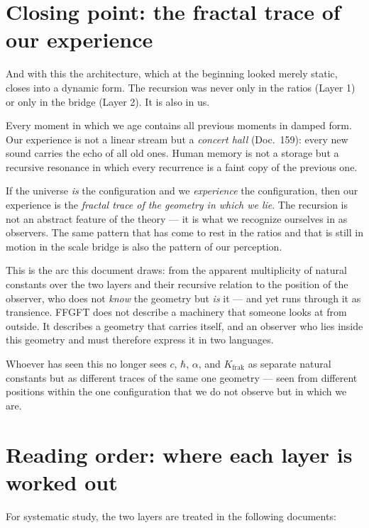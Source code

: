 \section{Closing point: the fractal trace of our experience}

And with this the architecture, which at the beginning looked merely
static, closes into a dynamic form. The recursion was never only in
the ratios (Layer 1) or only in the bridge (Layer 2). It is also in us.

Every moment in which we age contains all previous moments in damped
form. Our experience is not a linear stream but a \emph{concert hall}
(Doc.~159): every new sound carries the echo of all old ones. Human
memory is not a storage but a recursive resonance in which every
recurrence is a faint copy of the previous one.

If the universe \emph{is} the configuration and we \emph{experience}
the configuration, then our experience is the \emph{fractal trace of
the geometry in which we lie}. The recursion is not an abstract
feature of the theory --- it is what we recognize ourselves in as
observers. The same pattern that has come to rest in the ratios and
that is still in motion in the scale bridge is also the pattern of
our perception.

\medskip

This is the arc this document draws: from the apparent multiplicity
of natural constants over the two layers and their recursive
relation to the position of the observer, who does not \emph{know}
the geometry but \emph{is} it --- and yet runs through it as
transience. FFGFT does not describe a machinery that someone looks at
from outside. It describes a geometry that carries itself, and an
observer who lies inside this geometry and must therefore express it
in two languages.

Whoever has seen this no longer sees $c$, $\hbar$, $\alpha$, and
$K_{\mathrm{frak}}$ as separate natural constants but as different
traces of the same one geometry --- seen from different positions
within the one configuration that we do not observe but in which we are.

\section{Reading order: where each layer is worked out}

For systematic study, the two layers are treated in the following
documents:

